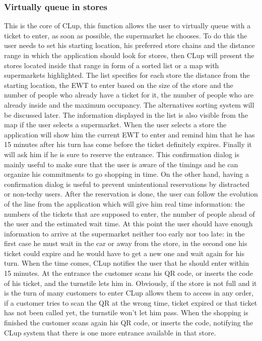 \subsubsection{Virtually queue in stores}
This is the core of CLup, this function allows the user to virtually queue with a ticket to enter, as soon as possible, the supermarket he chooses. To do this the user needs to set his starting location, his preferred store chains and the distance range in which the application should look for stores, then CLup will present the stores located inside that range in form of a sorted list or a map with supermarkets highlighted. The list specifies for each store the distance from the starting location, the EWT to enter based on the size of the store and the number of people who already have a ticket for it, the number of people who are already inside and the maximum occupancy. The alternatives sorting system will be discussed later. The information displayed in the list is also visible from the map if the user selects a supermarket. When the user selects a store the application will show him the current EWT to enter and remind him that he has 15 minutes after his turn has come before the ticket definitely expires. Finally it will ask him if he is sure to reserve the entrance. This confirmation dialog is mainly useful to make sure that the user is aware of the timings and he can organize his commitments to go shopping in time. On the other hand, having a confirmation dialog is useful to prevent unintentional reservations by distracted or non-techy users. After the reservation is done, the user can follow the evolution of the line from the application which will give him real time information: the numbers of the tickets that are supposed to enter, the number of people ahead of the user and the estimated wait time. At this point the user should have enough information to arrive at the supermarket neither too early nor too late: in the first case he must wait in the car or away from the store, in the second one his ticket could expire and he would have to get a new one and wait again for his turn. When the time comes, CLup notifies the user that he should enter within 15 minutes. At the entrance the customer scans his QR code, or inserts the code of his ticket, and the turnstile lets him in. Obviously, if the store is not full and it is the turn of many customers to enter CLup allows them to access in any order, if a customer tries to scan the QR at the wrong time, ticket expired or that ticket has not been called yet, the turnstile won’t let him pass. When the shopping is finished the customer scans again his QR code, or inserts the code, notifying the CLup system that there is one more entrance available in that store.
